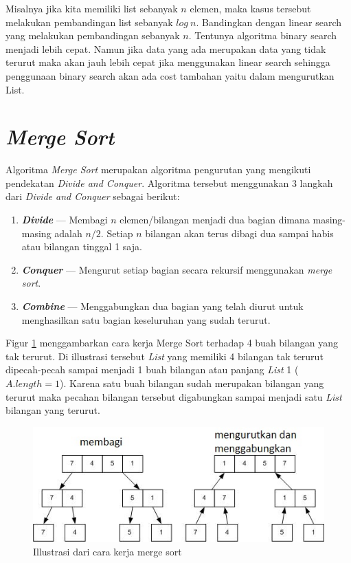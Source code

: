 \documentclass[12pt]{book}%
\begin{document}
Misalnya jika kita memiliki list sebanyak $n$ elemen, maka kasus tersebut melakukan pembandingan list sebanyak $log\ n$. Bandingkan dengan linear search yang  melakukan pembandingan sebanyak $n$. Tentunya algoritma binary search menjadi lebih cepat. Namun jika data yang ada merupakan data yang tidak terurut maka akan jauh lebih cepat jika menggunakan linear search sehingga penggunaan binary search akan ada cost tambahan yaitu dalam mengurutkan List.

\section{\textit{Merge Sort}}
Algoritma \textit{Merge Sort} merupakan algoritma pengurutan yang mengikuti pendekatan \textit{Divide and Conquer}. Algoritma tersebut menggunakan 3 langkah dari \textit{Divide and Conquer} sebagai berikut:
\begin{enumerate}
\item \textbf{\textit{Divide}} --- Membagi $n$ elemen/bilangan menjadi dua bagian dimana masing-masing adalah $n/2$. Setiap $n$ bilangan akan terus dibagi dua sampai habis atau bilangan tinggal 1 saja.
\item \textbf{\textit{Conquer}} --- Mengurut setiap bagian secara rekursif menggunakan \textit{merge sort}. 
\item \textbf{\textit{Combine}} --- Menggabungkan dua bagian yang telah diurut untuk menghasilkan satu bagian keseluruhan yang sudah terurut.
\end{enumerate}

Figur \ref{fig:mergeSortIllustration} menggambarkan cara kerja Merge Sort terhadap 4 buah bilangan yang tak terurut. Di illustrasi tersebut \textit{List} yang memiliki 4 bilangan tak terurut dipecah-pecah sampai menjadi 1 buah bilangan atau panjang \textit{List} 1 ($A.length = 1$). Karena satu buah bilangan sudah merupakan bilangan yang terurut maka pecahan bilangan tersebut digabungkan sampai menjadi satu \textit{List} bilangan yang terurut. 

\begin{figure}[htbp]
\begin{center}
	\includegraphics[scale=0.8]{fig/sunario-3/mergeSort1.jpg}%
	\caption{Illustrasi dari cara kerja merge sort}%
	\label{fig:mergeSortIllustration}%
\end{center}
\end{figure}
\end{document}

